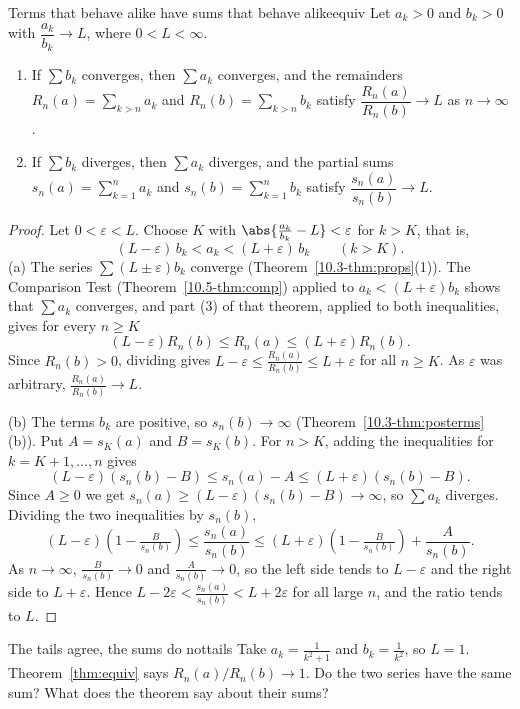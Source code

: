 \documentclass[11pt]{article}
\begin{document}
\begin{thm}{Terms that behave alike have sums that behave alike}{equiv}
Let $a_k>0$ and $b_k>0$ with $\dfrac{a_k}{b_k}\to L$, where $0<L<\infty$.
\begin{enumerate}[label=(\alph*)]
  \item If $\sum b_k$ converges, then $\sum a_k$ converges, and the remainders $R_n(a)=\sum_{k>n}a_k$ and $R_n(b)=\sum_{k>n}b_k$ satisfy $\dfrac{R_n(a)}{R_n(b)}\to L$ as $n\to\infty$.
  \item If $\sum b_k$ diverges, then $\sum a_k$ diverges, and the partial sums $s_n(a)=\sum_{k=1}^na_k$ and $s_n(b)=\sum_{k=1}^nb_k$ satisfy $\dfrac{s_n(a)}{s_n(b)}\to L$.
\end{enumerate}
\end{thm}
\begin{proof}
Let $0<\varepsilon<L$. Choose $K$ with $\abs{\frac{a_k}{b_k}-L}<\varepsilon$ for $k>K$, that is,
\[
(L-\varepsilon)\,b_k<a_k<(L+\varepsilon)\,b_k\qquad(k>K).
\]
(a) The series $\sum(L\pm\varepsilon)b_k$ converge (Theorem~\ref{10.3-thm:props}(1)). The Comparison Test (Theorem~\ref{10.5-thm:comp}) applied to $a_k<(L+\varepsilon)b_k$ shows that $\sum a_k$ converges, and part (3) of that theorem, applied to both inequalities, gives for every $n\ge K$
\[
(L-\varepsilon)R_n(b)\le R_n(a)\le(L+\varepsilon)R_n(b).
\]
Since $R_n(b)>0$, dividing gives $L-\varepsilon\le\frac{R_n(a)}{R_n(b)}\le L+\varepsilon$ for all $n\ge K$. As $\varepsilon$ was arbitrary, $\frac{R_n(a)}{R_n(b)}\to L$.

(b) The terms $b_k$ are positive, so $s_n(b)\to\infty$ (Theorem~\ref{10.3-thm:posterms}(b)). Put $A=s_K(a)$ and $B=s_K(b)$. For $n>K$, adding the inequalities for $k=K+1,\dots,n$ gives
\[
(L-\varepsilon)\left(s_n(b)-B\right)\le s_n(a)-A\le(L+\varepsilon)\left(s_n(b)-B\right).
\]
Since $A\ge0$ we get $s_n(a)\ge(L-\varepsilon)\left(s_n(b)-B\right)\to\infty$, so $\sum a_k$ diverges. Dividing the two inequalities by $s_n(b)$,
\[
(L-\varepsilon)\left(1-\tfrac B{s_n(b)}\right)\le\frac{s_n(a)}{s_n(b)}\le(L+\varepsilon)\left(1-\tfrac B{s_n(b)}\right)+\frac A{s_n(b)}.
\]
As $n\to\infty$, $\frac B{s_n(b)}\to0$ and $\frac A{s_n(b)}\to0$, so the left side tends to $L-\varepsilon$ and the right side to $L+\varepsilon$. Hence $L-2\varepsilon<\frac{s_n(a)}{s_n(b)}<L+2\varepsilon$ for all large $n$, and the ratio tends to $L$.
\end{proof}

\begin{think}{The tails agree, the sums do not}{tails}
Take $a_k=\frac1{k^2+1}$ and $b_k=\frac1{k^2}$, so $L=1$. Theorem~\ref{thm:equiv} says $R_n(a)/R_n(b)\to1$. Do the two series have the same sum? What does the theorem say about their sums?
\end{think}
\end{document}
